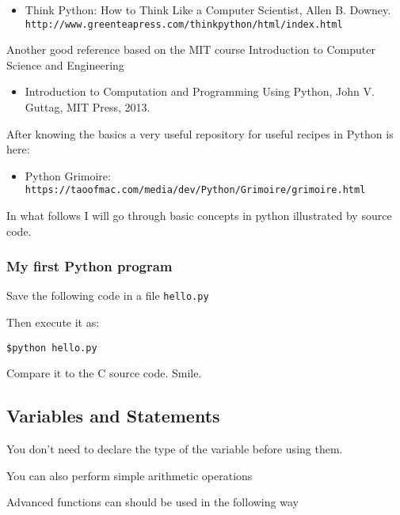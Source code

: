 \documentclass{article}
\begin{document}
\begin{itemize}
\item Think Python: How to Think Like a Computer Scientist, Allen
  B. Downey.\\\verb"http://www.greenteapress.com/thinkpython/html/index.html" 
\end{itemize}

Another good reference based on the MIT course Introduction to Computer Science and Engineering

\begin{itemize}
\item Introduction to Computation and Programming Using Python, John V. Guttag, MIT Press, 2013.
\end{itemize}

After knowing the basics a very useful repository for useful recipes
in Python is here:

\begin{itemize}
\item Python Grimoire: \\\verb"https://taoofmac.com/media/dev/Python/Grimoire/grimoire.html"
\end{itemize}

In what follows I will go through basic concepts in python illustrated
by source code.

\subsubsection{My first Python program}

Save the following code in a file \verb"hello.py"


Then execute it as:
\begin{verbatim}
$python hello.py
\end{verbatim}

Compare it to the C source code. Smile.

\subsection{Variables and Statements}
You don't need to declare the type of the variable before using them. 
 



You can also perform simple arithmetic operations


Advanced functions can should be used in the following way

\end{document}
